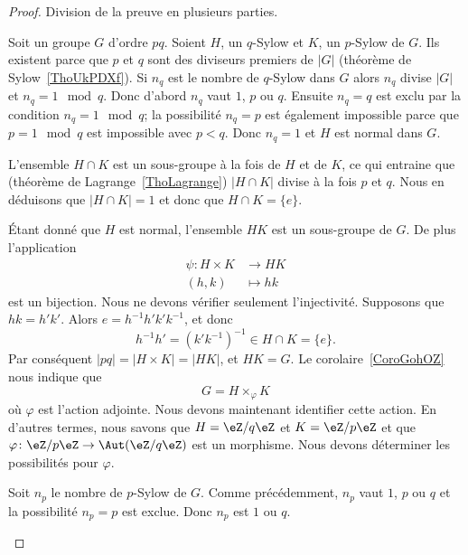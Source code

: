 \begin{proof}
	Division de la preuve en plusieurs parties.
	\begin{subproof}

		Soit un groupe \( G\) d'ordre \( pq\). Soient \( H\), un \( q\)-Sylow et \( K\), un \( p\)-Sylow de \( G\). Ils existent parce que \( p\) et \( q\) sont des diviseurs premiers de \( | G |\) (théorème de Sylow~\ref{ThoUkPDXf}). Si \( n_q\) est le nombre de \( q\)-Sylow dans \( G\) alors \( n_q\) divise \( | G |\) et \( n_q=1\mod q\). Donc d'abord \( n_q\) vaut \( 1\), \( p\) ou \( q\). Ensuite \( n_q=q\) est exclu par la condition \( n_q=1\mod q\); la possibilité \( n_q=p\) est également impossible parce que \( p=1\mod q\) est impossible avec \( p<q\). Donc \( n_q=1\) et \( H\) est normal dans \( G\).

		L'ensemble \( H\cap K\) est un sous-groupe à la fois de \( H\) et de \( K\), ce qui entraine que (théorème de Lagrange~\ref{ThoLagrange}) \( | H\cap K |\) divise à la fois \( p\) et \( q\). Nous en déduisons que \( | H\cap K |=1\) et donc que \( H\cap K=\{ e \}\).

		Étant donné que \( H\) est normal, l'ensemble \( HK\) est un sous-groupe de \( G\). De plus l'application
		\begin{equation}
			\begin{aligned}
				\psi\colon H\times K & \to HK     \\
				(h,k)                & \mapsto hk
			\end{aligned}
		\end{equation}
		est un bijection. Nous ne devons vérifier seulement l'injectivité. Supposons que \( hk=h'k'\). Alors \( e=h^{-1}h'k'k^{-1}\), et donc
		\begin{equation}
			h^{-1} h'=(k'k^{-1})^{-1}\in H\cap K=\{ e \}.
		\end{equation}
		Par conséquent \( | pq |=| H\times K |=| HK |\), et \( HK=G\). Le corolaire~\ref{CoroGohOZ} nous indique que
		\begin{equation}    \label{EqGjQjFN}
			G=H\times_{\varphi}K
		\end{equation}
		où \( \varphi\) est l'action adjointe. Nous devons maintenant identifier cette action. En d'autres termes, nous savons que \( H=\eZ/q\eZ\) et \( K=\eZ/p\eZ\) et que \( \varphi\colon \eZ/p\eZ\to \Aut(\eZ/q\eZ)\) est un morphisme. Nous devons déterminer les possibilités pour \( \varphi\).

		Soit \( n_p\) le nombre de \( p\)-Sylow de \( G\). Comme précédemment, \( n_p\) vaut \( 1\), \( p\) ou \( q\) et la possibilité \( n_p=p\) est exclue. Donc \( n_p\) est \( 1\) ou \( q\).


\end{subproof}
\end{proof}

